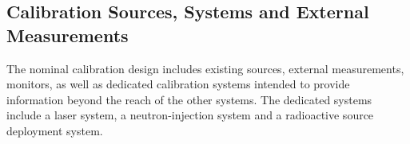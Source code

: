\subsection{Calibration Sources, Systems and External Measurements}
\label{sec:phys-calib-sources}

The nominal calibration design includes existing sources, external measurements, monitors, as well as dedicated calibration systems intended to provide information beyond the reach of the other systems. The dedicated systems include a laser system, a neutron-injection system and a radioactive source deployment system. 


